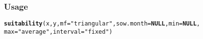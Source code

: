 \documentclass[11pt,fleqn]{article}\usepackage[]{graphicx}\usepackage[]{color}
\makeatletter
\newcommand{\hlstr}[1]{\textcolor[rgb]{0.192,0.494,0.8}{#1}}%
\newcommand{\hlstd}[1]{\textcolor[rgb]{0.345,0.345,0.345}{#1}}%
\newcommand{\hlkwa}[1]{\textcolor[rgb]{0.161,0.373,0.58}{\textbf{#1}}}%
\newcommand{\hlkwc}[1]{\textcolor[rgb]{0.333,0.667,0.333}{#1}}%
\newcommand{\hlkwd}[1]{\textcolor[rgb]{0.737,0.353,0.396}{\textbf{#1}}}%
\newenvironment{kframe}{%
 \def\at@end@of@kframe{}%
 \ifinner\ifhmode%
  \def\at@end@of@kframe{\end{minipage}}%
  \begin{minipage}{\columnwidth}%
 \fi\fi%
 \def\FrameCommand##1{\hskip\@totalleftmargin \hskip-\fboxsep
 \colorbox{shadecolor}{##1}\hskip-\fboxsep
     \hskip-\linewidth \hskip-\@totalleftmargin \hskip\columnwidth}%
 \MakeFramed {\advance\hsize-\width
   \@totalleftmargin\z@ \linewidth\hsize
   \@setminipage}}%
 {\par\unskip\endMakeFramed%
 \at@end@of@kframe}
\newenvironment{knitrout}{}{} %
\makeatother
\begin{document}
\subsubsection*{Usage}
\begin{knitrout}
\color{fgcolor}\begin{kframe}
\begin{alltt}
\hlkwd{suitability}\hlstd{(x, y,} \hlkwc{mf} \hlstd{=} \hlstr{"triangular"}\hlstd{,} \hlkwc{sow.month} \hlstd{=} \hlkwa{NULL}\hlstd{,} \hlkwc{min} \hlstd{=} \hlkwa{NULL}\hlstd{,}
    \hlkwc{max} \hlstd{=} \hlstr{"average"}\hlstd{,} \hlkwc{interval} \hlstd{=} \hlstr{"fixed"}\hlstd{)}
\end{alltt}
\end{kframe}
\end{knitrout}
\vspace{-0.5cm}
\end{document}
